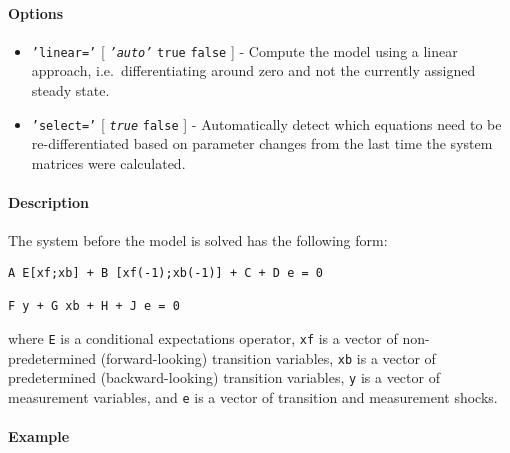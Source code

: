 \paragraph{Options}\label{options}

\begin{itemize}
\item
  \texttt{'linear='} {[} \emph{\texttt{'auto'}} \textbar{} \texttt{true}
  \textbar{} \texttt{false} {]} - Compute the model using a linear
  approach, i.e.~differentiating around zero and not the currently
  assigned steady state.
\item
  \texttt{'select='} {[} \emph{\texttt{true}} \textbar{} \texttt{false}
  {]} - Automatically detect which equations need to be
  re-differentiated based on parameter changes from the last time the
  system matrices were calculated.
\end{itemize}

\paragraph{Description}\label{description}

The system before the model is solved has the following form:

\begin{verbatim}
A E[xf;xb] + B [xf(-1);xb(-1)] + C + D e = 0

F y + G xb + H + J e = 0
\end{verbatim}

where \texttt{E} is a conditional expectations operator, \texttt{xf} is
a vector of non-predetermined (forward-looking) transition variables,
\texttt{xb} is a vector of predetermined (backward-looking) transition
variables, \texttt{y} is a vector of measurement variables, and
\texttt{e} is a vector of transition and measurement shocks.

\paragraph{Example}\label{example}


